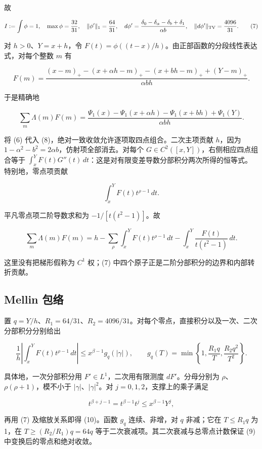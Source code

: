 \documentclass[UTF8,zihao=-4,fontset=fandol]{ctexart}
\begin{document}
故

\[
I:=\int\phi=1,\quad \max\phi=\frac{32}{31},\quad
\|\phi'\|_1=\frac{64}{31},\quad
d\phi'=\frac{\delta_0-\delta_\alpha-\delta_b+\delta_1}{\alpha b},\quad
\|d\phi'\|_{\rm TV}=\frac{4096}{31}. \tag{7}
\]

对 \(h>0\)、\(Y=x+h\)，令 \(F(t)=\phi((t-x)/h)\)。由正部函数的分段线性表达式，对每个整数 \(m\) 有

\[
F(m)=\frac{(x-m)_+-(x+\alpha h-m)_+-(x+bh-m)_++(Y-m)_+}{\alpha b h}.
\]

于是精确地

\[
\sum_m\Lambda(m)F(m)
=\frac{\Psi_1(x)-\Psi_1(x+\alpha h)-\Psi_1(x+bh)+\Psi_1(Y)}{\alpha b h}. \tag{8}
\]

将 (6) 代入 (8)，绝对一致收敛允许逐项取四点组合。二次主项贡献 \(h\)，因为 \(1-\alpha^2-b^2=2\alpha b\)，仿射项全部消去。对每个 \(G\in C^2([x,Y])\)，右侧相应四点组合等于 \(\int_x^Y F(t)G''(t)\,dt\)：这是对有限变差导数分部积分两次所得的恒等式。特别地，零点项贡献

\[
\int_x^Y F(t)t^{\rho-1}\,dt.
\]

平凡零点项二阶导数求和为 \(-1/[t(t^2-1)]\)。故

\[
\sum_m\Lambda(m)F(m)
=h-\sum_\rho\int_x^Y F(t)t^{\rho-1}\,dt
-\int_x^Y\frac{F(t)}{t(t^2-1)}\,dt. \tag{9}
\]

这里没有把梯形假称为 \(C^1\) 权；(7) 中四个原子正是二阶分部积分的边界和内部转折贡献。

\subsection{Mellin 包络}

置 \(q=Y/h\)、\(R_1=64/31\)、\(R_2=4096/31\)。对每个零点，直接积分以及一次、二次分部积分分别给出

\[
\frac1h\left|\int_x^Y F(t)t^{\rho-1}\,dt\right|
\le x^{\beta-1}g_q(|\gamma|),
\qquad
g_q(T)=\min\left\{1,\frac{R_1q}{T},\frac{R_2q^2}{T^2}\right\}. \tag{10}
\]

具体地，一次分部积分用 \(F'\in L^1\)，二次用有限测度 \(dF'\)。分母分别为 \(\rho\)、\(\rho(\rho+1)\)，模不小于 \(|\gamma|\)、\(|\gamma|^2\)。对 \(j=0,1,2\)，支撑上的乘子满足

\[
t^{\beta+j-1}=t^{\beta-1}t^j\le x^{\beta-1}Y^j,
\]

再用 (7) 及缩放关系即得 (10)。函数 \(g_q\) 连续、非增，对 \(q\) 非减；它在 \(T\le R_1q\) 为 1，在 \(T\ge(R_2/R_1)q=64q\) 等于二次衰减项。其二次衰减与总零点计数保证 (9) 中变换后的零点和绝对收敛。
\end{document}
